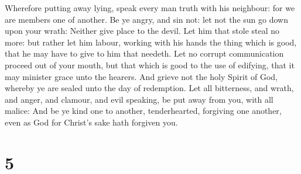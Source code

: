  Wherefore putting away lying, speak every man truth with
his neighbour: for we are members one of another.  Be ye
angry, and sin not: let not the sun go down upon your wrath:
 Neither give place to the devil.  Let him
that stole steal no more: but rather let him labour, working with his
hands the thing which is good, that he may have to give to him that
needeth.  Let no corrupt communication proceed out of
your mouth, but that which is good to the use of edifying, that it may
minister grace unto the hearers.  And grieve not the holy
Spirit of God, whereby ye are sealed unto the day of redemption.
 Let all bitterness, and wrath, and anger, and clamour,
and evil speaking, be put away from you, with all malice:
 And be ye kind one to another, tenderhearted, forgiving
one another, even as God for Christ's sake hath forgiven you.

\hypertarget{section-4}{%
\section{5}\label{section-4}}

